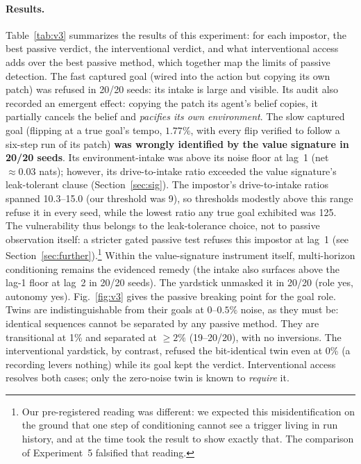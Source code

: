 \documentclass[11pt]{article}
\begin{document}
\paragraph{Results.}
Table~\ref{tab:v3} summarizes the results of this experiment: for each impostor, the
best passive verdict, the interventional verdict, and what interventional access adds
over the best passive method, which together map the limits of passive detection. The fast captured
goal (wired into the action but copying its own patch) was refused in 20/20 seeds: its
intake is large and visible. Its audit also recorded an emergent effect: copying the
patch its agent's belief copies, it partially cancels the belief and \emph{pacifies
its own environment}.
The slow captured goal (flipping at a true goal's tempo, $1.77\%$, with every flip
verified to follow a six-step run of its patch) \textbf{was wrongly identified by the
value signature in 20/20 seeds}. Its environment-intake was above its
noise floor at lag~1 (net $\approx 0.03$ nats); however, its drive-to-intake ratio exceeded
the value signature's leak-tolerant clause (Section~\ref{sec:sig}). The impostor's
drive-to-intake ratios spanned 10.3--15.0 (our threshold was 9), so
thresholds modestly above this range refuse it in every seed, while the lowest ratio
any true goal exhibited was 125. The vulnerability thus belongs to the
leak-tolerance choice, not to passive observation itself: a stricter gated passive
test refuses this impostor at lag~1 (see Section~\ref{sec:further}).\footnote{Our
pre-registered reading was different: we expected this misidentification on the
ground that one
step of conditioning cannot see a trigger living in run history, and at the time took
the result to show exactly that. The comparison of Experiment~5 falsified that
reading.} Within the value-signature
instrument itself, multi-horizon
conditioning remains the evidenced remedy (the intake also surfaces above the lag-1
floor at lag~2 in 20/20 seeds). The yardstick unmasked it in 20/20 (role yes,
autonomy yes). Fig.~\ref{fig:v3} gives the passive breaking point for the goal role.
Twins are indistinguishable from their goals at $0$--$0.5\%$ noise, as they must be:
identical sequences cannot be separated by any passive method. They are transitional
at 1\% and separated at $\geq 2\%$ (19--20/20), with no inversions. The interventional yardstick, by
contrast, refused the bit-identical twin even at 0\% (a recording levers nothing)
while its goal kept the verdict.
Interventional access resolves both cases; only the zero-noise twin is known to \emph{require} it.
\end{document}
